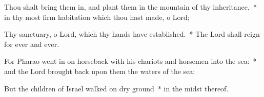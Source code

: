 \begin{enpars}
\item Thou shalt bring them in, and plant them in the mountain of thy inheritance,~* in thy most firm habitation which thou hast made, o Lord;
\item Thy sanctuary, o Lord, which thy hands have established.~* The Lord shall reign for ever and ever.
\item For Pharao went in on horseback with his chariots and horsemen into the sea:~* and the Lord brought back upon them the waters of the sea:
\item But the children of Israel walked on dry ground~* in the midst thereof.
\end{enpars}